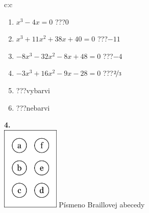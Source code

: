 \documentclass[10pt]{report}
\begin{document}
\begin{tabular}{c:c}
\begin{minipage}[c][104.5mm][t]{0.5\linewidth}
\begin{center}
\begin{minipage}{0.79\linewidth}
\begin{center}
\begin{varwidth}{\linewidth}
\begin{enumerate}
\Large
\item $x^3-4x=0$\quad \dotfill\; ???\;\dotfill \quad $0$
\item $x^3+11x^2+38x+40=0$\quad \dotfill\; ???\;\dotfill \quad $-11$
\item $-8x^3-32x^2-8x+48=0$\quad \dotfill\; ???\;\dotfill \quad $-4$
\item $-3x^3+16x^2-9x-28=0$\quad \dotfill\; ???\;\dotfill \quad $\nicefrac{2}{3}$
\item \quad \dotfill\; ???\;\dotfill \quad vybarvi
\item \quad \dotfill\; ???\;\dotfill \quad nebarvi
\end{enumerate}
\end{varwidth}
\end{center}
\end{minipage}
\begin{minipage}{0.20\linewidth}
\begin{center}
{\Huge\bfseries 4.} \\[2mm]
\includegraphics[height=40mm]{../images/braille.png}
{\small Písmeno Braillovej abecedy}
\end{center}
\end{minipage}
\end{center}
\end{minipage}
%
\end{tabular}
\newpage
\end{document}
